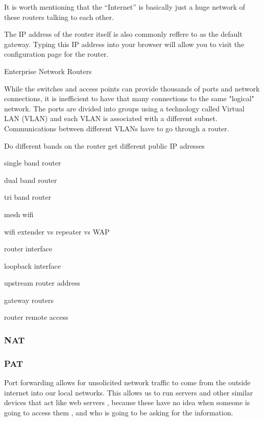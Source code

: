 It is worth mentioning that the ``Internet'' is basically just a huge network of
these routers talking to each other.

The IP address of the router itself is also commonly reffere to as the default
gateway. Typing this IP address into your browser will allow you to visit the
configuration page for the router.


Enterprise Network Routers

While the switches and access points can provide thousands of ports and network
connections, it is inefficient to have that many connections to the same
"logical" network. The ports are divided into groups using a technology called
Virtual LAN (VLAN) and each VLAN is associated with a different subnet.
Communications between different VLANs have to go through a router. 



Do different bands on the router get different public IP adresses

single band router

dual band router

tri band router

mesh wifi

wifi extender vs repeater vs WAP


router interface

loopback interface

upstream router address

gateway routers

router remote access

\subsubsection{NAT}
\label{sssec:nat}



\subsubsectionend

\subsubsection{PAT}
\label{sssec:pat}

Port forwarding allows for unsolicited network traffic to come from the outside
internet into our local networks. This allows us to run servers and other
similar devices that act like web servers , because these have no idea when
someone is going to access them , and who is going to be asking for the
information.

